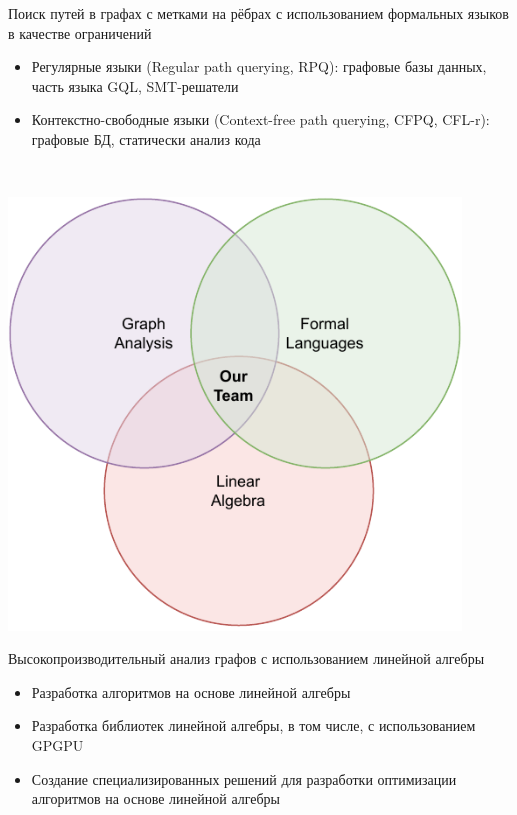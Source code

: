 \documentclass[xcolor=table,aspectratio=169]{beamer}
\begin{document}
\begin{frame}[fragile]
    \begin{itemize}
      \begin{minipage}{0.65\textwidth}
      \item Поиск путей в графах с метками на рёбрах с использованием формальных языков в качестве ограничений\footnotemark
      \begin{itemize}
        \item Регулярные языки (Regular path querying, RPQ): графовые базы данных, часть языка GQL, SMT-решатели
        \item Контекстно-свободные языки (Context-free path querying, CFPQ, CFL-r): графовые БД, статически анализ кода
      \end{itemize} 
    \end{minipage}~  
    \begin{minipage}{0.3\textwidth}
      \includegraphics[width = 0.9\textwidth]{pictures/ResearchArea.drawio.pdf}
    \end{minipage}  
      \item Высокопроизводительный анализ графов с использованием линейной алгебры
      \begin{itemize}
        \item Разработка алгоритмов на основе линейной алгебры
        \item Разработка библиотек линейной алгебры, в том числе, с использованием GPGPU
        \item Создание специализированных решений для разработки оптимизации алгоритмов на основе линейной алгебры
      \end{itemize}
    \end{itemize} 
\end{frame}
\end{document}
